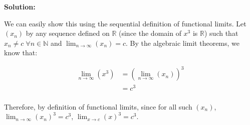 \documentclass{article}
\newenvironment{solution}{
	\vspace{0.4cm}\par\noindent\large\textbf{{Solution:}}\par\vspace{1em}
}{
	\vspace{2.5em}
	\newpage
}
\begin{document}
\begin{solution}
	We can easily show this using the sequential definition of functional limits. Let $(x_n)$ by any sequence defined on $\mathbb{R}$ (since the domain of $x^3$ is $\mathbb{R}$) such that $x_n \neq c \; \forall n \in \mathbb{N}$ and $\lim_{n\to\infty}(x_n) = c$. By the algebraic limit theorems, we know that:

	\begin{align*}
		\lim_{n\to\infty}(x^3) &= (\lim_{n\to\infty}(x_n))^3 \\
		&= c^3 \\
	\end{align*}

	Therefore, by definition of functional limits, since for all such $(x_n)$, $\lim_{n\to\infty}(x_n)^3 = c^3$, $\lim_{x \to c}(x)^3 = c^3$.
\end{solution}
\end{document}
